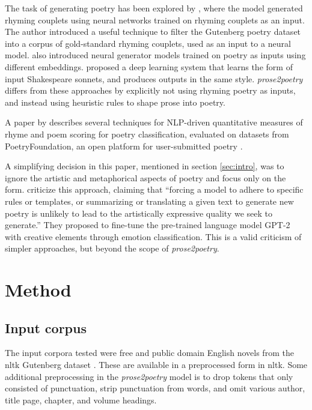 \documentclass[11pt,a4paper]{article}
\begin{document}
The task of generating poetry has been explored by \citet{cole}, where the model generated rhyming couplets using neural networks trained on rhyming couplets as an input. The author introduced a useful technique to filter the Gutenberg poetry dataset \cite{gutenbergpoetry} into a corpus of gold-standard rhyming couplets, used as an input to a neural model. \citet{hopkins-kiela-2017} also introduced neural generator models trained on poetry as inputs using different embeddings. \citet{Xie2017DeepP} proposed a deep learning system that learns the form of input Shakespeare sonnets, and produces outputs in the same style. \textit{prose2poetry} differs from these approaches by explicitly not using rhyming poetry as inputs, and instead using heuristic rules to shape prose into poetry.

A paper by \citet{keswarani} describes several techniques for NLP-driven quantitative measures of rhyme and poem scoring for poetry classification, evaluated on datasets from PoetryFoundation, an open platform for user-submitted poetry \cite*{poetryfoundation}.

A simplifying decision in this paper, mentioned in section \ref{sec:intro}, was to ignore the artistic and metaphorical aspects of poetry and focus only on the form. \citet{bena2020introducing} criticize this approach, claiming that ``forcing a model to adhere to specific rules or templates, or summarizing or translating a given text to generate new poetry is unlikely to lead to the artistically expressive quality we seek to generate.'' They proposed to fine-tune the pre-trained language model GPT-2 with creative elements through emotion classification. This is a valid criticism of simpler approaches, but beyond the scope of \textit{prose2poetry}.

\section{Method}
\label{sec:method}

\subsection{Input corpus}

The input corpora tested were free and public domain English novels from the nltk Gutenberg dataset \cite[Chapter~2]{gutenbergnltk}. These are available in a preprocessed form in nltk. Some additional preprocessing in the \textit{prose2poetry} model is to drop tokens that only consisted of punctuation, strip punctuation from words, and omit various author, title page, chapter, and volume headings.
\end{document}
